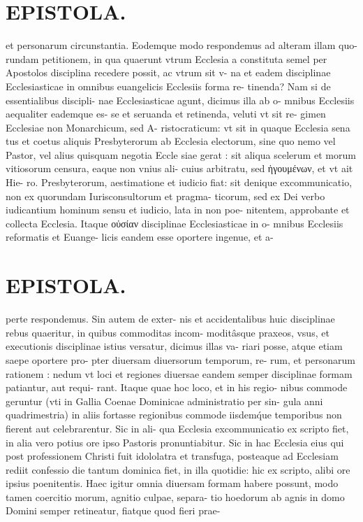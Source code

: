 \documentclass{article}
\begin{document}
\begin{pages}
\section*{EPISTOLA. }et personarum circunstantia. Eodemque modo respondemus ad alteram illam quo- rundam petitionem, in qua quaerunt vtrum Ecclesia a constituta semel per Apostolos disciplina recedere possit, ac vtrum sit v- na et eadem disciplinae Ecclesiasticae in omnibus euangelicis Ecclesiis forma re- tinenda? Nam si de essentialibus discipli- nae Ecclesiasticae agunt, dicimus illa ab o- mnibus Ecclesiis aequaliter eademque es- se et seruanda et retinenda, veluti vt sit re- gimen Ecclesiae non Monarchicum, sed A- ristocraticum: vt sit in quaque Ecclesia sena tus et coetus aliquis Presbyterorum ab Ecclesia electorum, sine quo nemo vel Pastor, vel alius quisquam negotia Eccle siae gerat : sit aliqua scelerum et morum vitiosorum censura, eaque non vnius ali- cuius arbitratu, sed ἡγουμένων, et vt ait Hie- ro. Presbyterorum, aestimatione et iudicio fiat: sit denique excommunicatio, non ex quorundam Iurisconsultorum et pragma- ticorum, sed ex Dei verbo iudicantium hominum sensu et iudicio, lata in non poe- nitentem, approbante et collecta Ecclesia. Itaque οὐσίαν disciplinae Ecclesiasticae in o- mnibus Ecclesiis reformatis et Euange- licis eandem esse oportere ingenue, et a- 
\section*{EPISTOLA. }perte respondemus. Sin autem de exter- nis et accidentalibus huic disciplinae rebus quaeritur, in quibus commoditas incom- moditâsque praxeos, vsus, et executionis disciplinae istius versatur, dicimus illas va- riari posse, atque etiam saepe oportere pro- pter diuersam diuersorum temporum, re- rum, et personarum rationem : nedum vt loci et regiones diuersae eandem semper disciplinae formam patiantur, aut requi- rant. Itaque quae hoc loco, et in his regio- nibus commode geruntur (vti in Gallia Coenae Dominicae administratio per sin- gula anni quadrimestria) in aliis fortasse regionibus commode iisdemq́ue temporibus non fierent aut celebrarentur. Sic in ali- qua Ecclesia excommunicatio ex scripto fiet, in alia vero potius ore ipso Pastoris pronuntiabitur. Sic in hac Ecclesia eius qui post professionem Christi fuit idololatra et transfuga, posteaque ad Ecclesiam rediit confessio die tantum dominica fiet, in illa quotidie: hic ex scripto, alibi ore ipsius poenitentis. Haec igitur omnia diuersam formam habere possunt, modo tamen coercitio morum, agnitio culpae, separa- tio hoedorum ab agnis in domo Domini semper retineatur, fiatque quod fieri prae- 

\end{pages}
\end{document}
